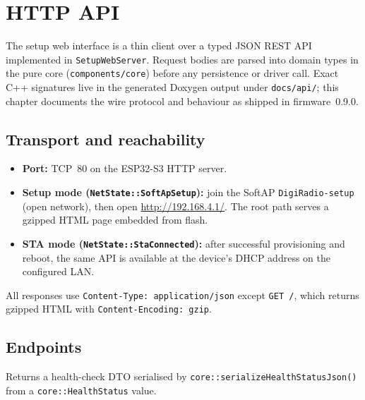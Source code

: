 \chapter{HTTP API}
\label{ch:api}

The setup web interface is a thin client over a typed JSON REST API
implemented in \texttt{SetupWebServer}. Request bodies are parsed into
domain types in the pure core (\texttt{components/core}) before any
persistence or driver call. Exact C++ signatures live in the generated
Doxygen output under \texttt{docs/api/}; this chapter documents the
wire protocol and behaviour as shipped in firmware~0.9.0.

\section{Transport and reachability}

\begin{itemize}
  \item \textbf{Port:} TCP~80 on the ESP32-S3 HTTP server.
  \item \textbf{Setup mode (\texttt{NetState::SoftApSetup}):} join the
        SoftAP \texttt{DigiRadio-setup} (open network), then open
        \url{http://192.168.4.1/}. The root path serves a gzipped HTML
        page embedded from flash.
  \item \textbf{STA mode (\texttt{NetState::StaConnected}):} after
        successful provisioning and reboot, the same API is available at
        the device's DHCP address on the configured LAN.
\end{itemize}

All responses use \texttt{Content-Type: application/json} except
\texttt{GET /}, which returns gzipped HTML with
\texttt{Content-Encoding: gzip}.

\section{Endpoints}

\label{sec:api-health}

Returns a health-check DTO serialised by
\texttt{core::serializeHealthStatusJson()} from a
\texttt{core::HealthStatus} value.

